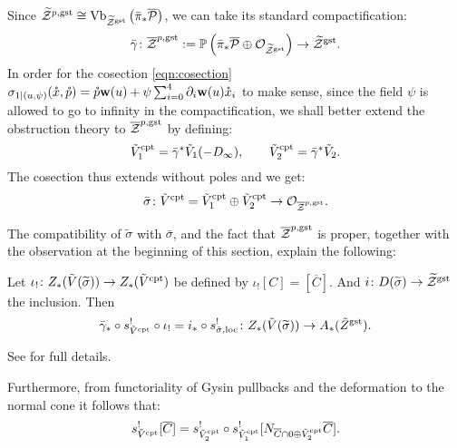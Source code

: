 Since $\tZ^{p,\rm{gst}}\cong\operatorname{Vb}_{\tZ^{\rm{gst}}}\left(\bar{\pi}_*\overline{\mathcal P}\right)$, we can take its standard compactification:
\[\bar{\gamma}\colon \overline{\mathcal Z}^{p,\rm{gst}}:=\PP\left(\bar{\pi}_*\overline{\mathcal P}\oplus \OO_{\tZ^{\rm{gst}}}\right)\to \tZ^{\rm{gst}}.\]
In order for the cosection \eqref{eqn:cosection}
$\sigma_{1|(u,\psi)}(\mathring{x},\mathring{p})=\mathring{p}\w(u)+\psi\sum_{i=0}^4\partial_i\w(u)\mathring{x}_i$
to make sense, since the field $\psi$ is allowed to go to infinity in the compactification, we shall better extend the obstruction theory to $\oZp$ by defining:
\[\tilde{V}^{\rm{cpt}}_1=\bar{\gamma}^*\tilde V_1(-D_{\infty}),\qquad \tilde{V}^{\rm{cpt}}_2=\bar{\gamma}^*\tilde V_2.\]
The cosection thus extends without poles and we get:
\[\bar{\sigma}\colon \tilde{V}^{\rm{cpt}}=\tilde{V}^{\rm{cpt}}_1\oplus \tilde{V}^{\rm{cpt}}_2\to\OO_{\oZp}. \]
 
 The compatibility of $\tilde\sigma$ with $\bar\sigma$, and the fact that $\oZp$ is proper, together with the observation at the beginning of this section, explain the following:
 \begin{prop}
 Let $\iota_{!}\colon Z_*(\tilde{V}(\widetilde{\sigma}))\to Z_*(\tilde{V}^{\rm{cpt}})$ be defined by 
 $\iota_{!}[C]=[\overline{C}].$ And $i\colon D(\widetilde{\sigma})\to \tZ^{\rm{gst}}$ the inclusion. Then
 \[\bar{\gamma}_*\circ s^{!}_{\tilde{V}^{\rm{cpt}}}\circ\iota_{!}=i_*\circ s^{!}_{\tilde\sigma,\rm{loc}}\colon  Z_*(\tilde{V}(\widetilde{\sigma}))\to A_*(\tilde{Z}^{\rm{gst}}).\]
 \end{prop}
 See \cite[Proposition~6.4]{CL} for full details.
 
 Furthermore, from functoriality of Gysin pullbacks and the deformation to the normal cone it follows that:
 \[s^!_{\tilde V^{\rm{cpt}}}[\overline C]=s^!_{\tilde V_2^{\rm{cpt}}}\circ s^!_{\tilde V_1^{\rm{cpt}}}[N_{\overline C\cap 0\oplus\tilde V_2^{\rm{cpt}}}\overline C].\]
 

